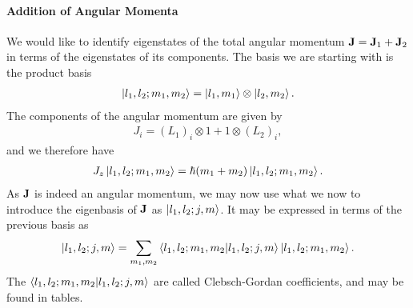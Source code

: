 \paragraph{Addition of Angular Momenta}
We would like to identify eigenstates of the total angular momentum $\vb{J} = \vb{J}_{1} + \vb{J}_{2}$ in terms of the eigenstates of its components. The basis we are starting with is the product basis
\begin{align*}
	\ket{l_{1}, l_{2}; m_{1}, m_{2}} = \ket{l_{1}, m_{1}}\otimes\ket{l_{2}, m_{2}}.
\end{align*}
The components of the angular momentum are given by
\begin{align*}
	J_{i} = (L_{1})_{i}\otimes 1 + 1\otimes (L_{2})_{i},
\end{align*}
and we therefore have
\begin{align*}
	J_{z}\ket{l_{1}, l_{2}; m_{1}, m_{2}} = \hbar(m_{1} + m_{2})\ket{l_{1}, l_{2}; m_{1}, m_{2}}.
\end{align*}
As $\vb{J}$ is indeed an angular momentum, we may now use what we now to introduce the eigenbasis of $\vb{J}$ as $\ket{l_{1}, l_{2}; j, m}$. It may be expressed in terms of the previous basis as
\begin{align*}
	\ket{l_{1}, l_{2}; j, m} = \sum\limits_{m_{1}, m_{2}}\braket{l_{1}, l_{2}; m_{1}, m_{2}}{l_{1}, l_{2}; j, m}\ket{l_{1}, l_{2}; m_{1}, m_{2}}.
\end{align*}
The $\braket{l_{1}, l_{2}; m_{1}, m_{2}}{l_{1}, l_{2}; j, m}$ are called Clebsch-Gordan coefficients, and may be found in tables.

